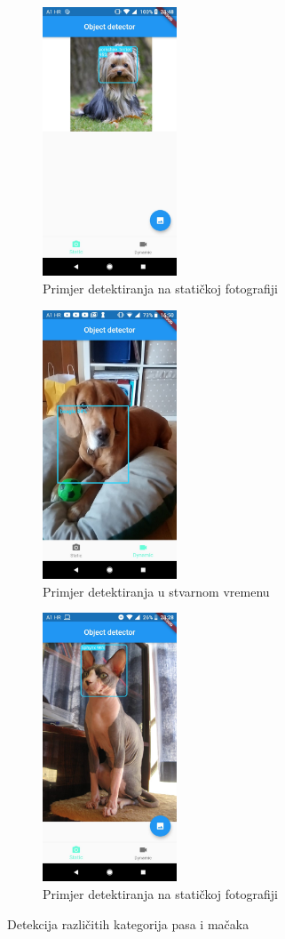 \begin{figure}[htb]
    \begin{subfigure}{.3\textwidth}
        \centering
        \includegraphics[height=8cm]{img/app-test-yorkie.jpeg}
        \caption{Primjer detektiranja na statičkoj fotografiji}
        \label{App-yorkie}
    \end{subfigure}
    \begin{subfigure}{.3\textwidth}
        \centering
        \includegraphics[height=8cm]{img/app-test-beagle.jpeg}
        \caption{Primjer detektiranja u stvarnom vremenu}
        \label{App-beagle}
    \end{subfigure}
    \begin{subfigure}{.3\textwidth}
        \centering
        \includegraphics[height=8cm]{img/app-test-spinx.jpeg}
        \caption{Primjer detektiranja na statičkoj fotografiji}
        \label{App-spinx}
    \end{subfigure}
\caption{Detekcija različitih kategorija pasa i mačaka}
\label{fig:CAT_Eval}
\end{figure}
